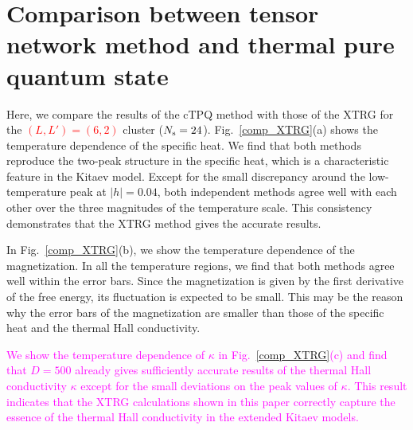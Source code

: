 \documentclass[reprint,amsmath,amssymb,aps,prx]{revtex4-2}
\newcommand{\red}[1]{\textcolor{red}{#1}}
\newcommand{\magenta}[1]{\textcolor{magenta}{#1}}
\begin{document}
\section{Comparison between tensor network method and thermal pure quantum state}
Here, we compare the results of the cTPQ method with those of the XTRG
for the \red{$(L, L') = (6, 2)$} cluster ($N_{\rm s}=24$). 
Fig.~\ref{comp_XTRG}(a) shows the temperature dependence of the specific heat. 
We find that both methods reproduce 
the two-peak structure in the specific heat, which is a 
characteristic feature in the Kitaev model. 
Except for the small discrepancy around the low-temperature peak 
at $|h|=0.04$, both independent methods agree well with each other
over the three magnitudes of the temperature scale.
This consistency demonstrates that the XTRG method gives the accurate results.

In Fig.~\ref{comp_XTRG}(b),
we show the temperature dependence of the magnetization.
In all the temperature regions, 
we find that both methods agree well within the error bars.
Since the magnetization is given by the first derivative of the
free energy, its fluctuation is expected to be small.
This may be the reason why the error bars of the magnetization
are smaller than those of the specific heat 
and the thermal Hall conductivity.

\magenta{We show the temperature dependence of $\kappa$
in Fig.~\ref{comp_XTRG}(c) and find that
$D=500$ already gives sufficiently accurate
results of the thermal Hall conductivity $\kappa$ except for the small deviations on the
peak values of $\kappa$. 
This result indicates that  
the XTRG calculations shown in this paper correctly capture the essence of the
thermal Hall conductivity in the extended Kitaev models.} 

\end{document}
